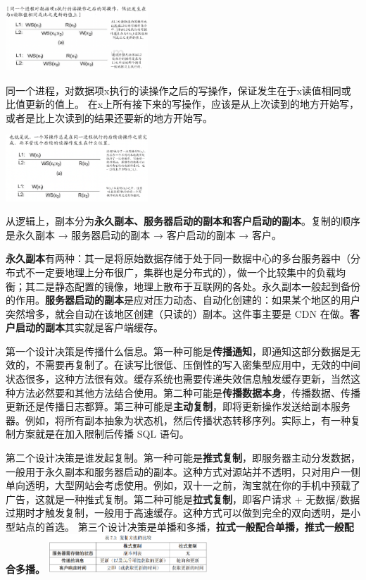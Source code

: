 \documentclass[twoside]{ctexart}
\begin{document}
\begin{multicols}{2}
  \includegraphics[width=0.4\textwidth,keepaspectratio]{pics/read-write.png}

   同一个进程，对数据项x执行的读操作之后的写操作，保证发生在于x读值相同或比值更新的值上。 在x上所有接下来的写操作，应该是从上次读到的地方开始写，或者是比上次读到的结果还要新的地方开始写。

 \includegraphics[width=0.4\textwidth,keepaspectratio]{pics/write-read.png}

    
    从逻辑上，副本分为\textbf{永久副本、服务器启动的副本和客户启动的副本}。复制的顺序是永久副本 → 服务器启动的副本 → 客户启动的副本 → 客户。
    
    \textbf{永久副本}有两种：其一是将原始数据存储于处于同一数据中心的多台服务器中（分布式不一定要地理上分布很广，集群也是分布式的），做一个比较集中的负载均衡；其二是静态配置的镜像，地理上散布于互联网的各处。永久副本一般起到备份的作用。\textbf{服务器启动的副本}是应对压力动态、自动化创建的：如果某个地区的用户突然增多，就会自动在该地区创建（只读的）副本。这件事主要是 CDN 在做。\textbf{客户启动的副本}其实就是客户端缓存。
    
    第一个设计决策是传播什么信息。第一种可能是\textbf{传播通知}，即通知这部分数据是无效的，不需要再复制了。在读写比很低、压倒性的写入密集型应用中，无效的中间状态很多，这种方法很有效。缓存系统也需要传递失效信息触发缓存更新，当然这种方法必然要和其他方法结合使用。第二种可能是\textbf{传播数据本身}，传播数据、传播更新还是传播日志都算。第三种可能是\textbf{主动复制}，即将更新操作发送给副本服务器。例如，将所有副本抽象为状态机，然后传播状态转移序列。实际上，有一种复制方案就是在加入限制后传播 SQL 语句。
    
    第二个设计决策是谁发起复制。第一种可能是\textbf{推式复制}，即服务器主动分发数据，一般用于永久副本和服务器启动的副本。这种方式对源站并不透明，只对用户一侧单向透明，大型网站会考虑使用。例如，双十一之前，淘宝就在你的手机中预载了广告，这就是一种推式复制。第二种可能是\textbf{拉式复制}，即客户请求 + 无数据/数据过期时才触发复制，一般用于高速缓存。这种方式可以做到完全的双向透明，是小型站点的首选。
    第三个设计决策是单播和多播，\textbf{拉式一般配合单播，推式一般配合多播。}  
  \includegraphics[width=0.45\textwidth,keepaspectratio]{pics/pull-push.png}


\end{multicols}
\end{document}

